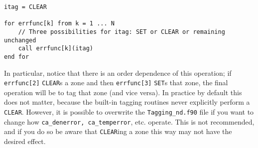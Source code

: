 \begin{verbatim}
itag = CLEAR

for errfunc[k] from k = 1 ... N
    // Three possibilities for itag: SET or CLEAR or remaining unchanged
    call errfunc[k](itag)  
end for
\end{verbatim}

In particular, notice that there is an order dependence of this operation; if {\tt errfunc[2]} 
{\tt CLEAR}s a zone and then {\tt errfunc[3]} {\tt SET}s that zone, the final operation will 
be to tag that zone (and vice versa). In practice by default this does not matter, because the 
built-in tagging routines never explicitly perform a \texttt{CLEAR}. However, 
it is possible to overwrite the {\tt Tagging\_nd.f90} file if you want to change how 
{\tt ca\_denerror, ca\_temperror}, etc. operate. This is not recommended, and if you do so
be aware that {\tt CLEAR}ing a zone this way may not have the desired effect.

